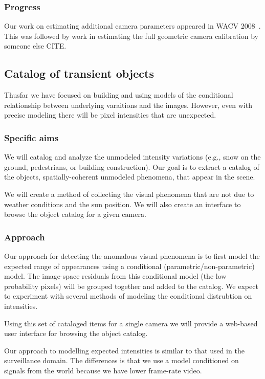 \subsubsection{Progress}

Our work on estimating additional camera parameters appeared in WACV 
2008~\cite{jacobs08geoorient}.  This was followed by work in
estimating the full geometric camera calibration by someone else CITE.


\subsection{Catalog of transient objects}

Thusfar we have focused on building and using models of the
conditional relationship between underlying varaitions and the images.
However, even with precise modeling there will be pixel intensities
that are unexpected. 

\subsubsection{Specific aims} 

We will catalog and analyze the unmodeled intensity variations (e.g.,
snow on the ground, pedestrians, or building construction).  Our goal
is to extract a catalog of the objects, spatially-coherent unmodeled
phenomena, that appear in the scene.

We will create a method of collecting the visual phenomena that are
not due to weather conditions and the sun position.  We will also
create an interface to browse the object catalog for a given camera.

\subsubsection{Approach}

Our approach for detecting the anomalous visual phenomena is to first
model the expected range of appearances using a conditional
(parametric/non-parametric) model.  The image-space residuals from
this conditional model (\ie the low probability pixels) will be
grouped together and added to the catalog.  We expect to experiment
with several methods of modeling the conditional distrubtion on
intensities.

Using this set of cataloged items for a single camera we will provide
a web-based user interface for browsing the object catalog.

Our approach to modelling expected intensities is similar to that used
in the surveillance domain.  The differences is that we use a model
conditioned on signals from the world because we have lower frame-rate
video. 

